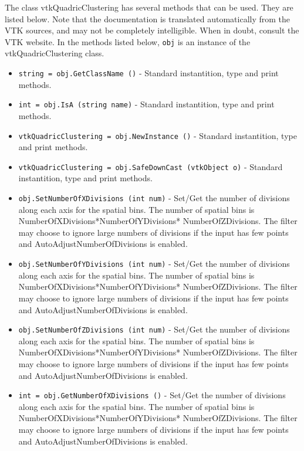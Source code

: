 The class vtkQuadricClustering has several methods that can be used.
  They are listed below.
Note that the documentation is translated automatically from the VTK sources,
and may not be completely intelligible.  When in doubt, consult the VTK website.
In the methods listed below, \verb|obj| is an instance of the vtkQuadricClustering class.
\begin{itemize}
\item  \verb|string = obj.GetClassName ()| -  Standard instantition, type and print methods.

\item  \verb|int = obj.IsA (string name)| -  Standard instantition, type and print methods.

\item  \verb|vtkQuadricClustering = obj.NewInstance ()| -  Standard instantition, type and print methods.

\item  \verb|vtkQuadricClustering = obj.SafeDownCast (vtkObject o)| -  Standard instantition, type and print methods.

\item  \verb|obj.SetNumberOfXDivisions (int num)| -  Set/Get the number of divisions along each axis for the spatial bins.
 The number of spatial bins is NumberOfXDivisions*NumberOfYDivisions*
 NumberOfZDivisions.  The filter may choose to ignore large numbers of
 divisions if the input has few points and AutoAdjustNumberOfDivisions
 is enabled.

\item  \verb|obj.SetNumberOfYDivisions (int num)| -  Set/Get the number of divisions along each axis for the spatial bins.
 The number of spatial bins is NumberOfXDivisions*NumberOfYDivisions*
 NumberOfZDivisions.  The filter may choose to ignore large numbers of
 divisions if the input has few points and AutoAdjustNumberOfDivisions
 is enabled.

\item  \verb|obj.SetNumberOfZDivisions (int num)| -  Set/Get the number of divisions along each axis for the spatial bins.
 The number of spatial bins is NumberOfXDivisions*NumberOfYDivisions*
 NumberOfZDivisions.  The filter may choose to ignore large numbers of
 divisions if the input has few points and AutoAdjustNumberOfDivisions
 is enabled.

\item  \verb|int = obj.GetNumberOfXDivisions ()| -  Set/Get the number of divisions along each axis for the spatial bins.
 The number of spatial bins is NumberOfXDivisions*NumberOfYDivisions*
 NumberOfZDivisions.  The filter may choose to ignore large numbers of
 divisions if the input has few points and AutoAdjustNumberOfDivisions
 is enabled.


\end{itemize}
